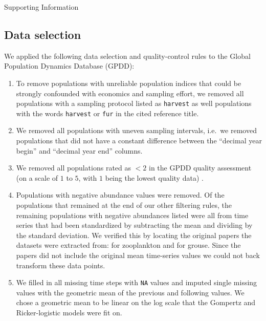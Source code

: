 
\begin{centering}
\LARGE
Supporting Information\\[1.0em]
\end{centering}

\subsection{Data selection}

We applied the following data selection and quality-control rules to the
Global Population Dynamics Database (GPDD):

\begin{enumerate}

\item To remove populations with unreliable population indices that could be
  strongly confounded with economics and sampling effort, we removed all
  populations with a sampling protocol listed as \texttt{harvest} as well
  populations with the words \texttt{harvest} or \texttt{fur} in the cited
  reference title.

\item We removed all populations with uneven sampling intervals, i.e.\ we
  removed populations that did not have a constant difference between the
  ``decimal year begin'' and ``decimal year end'' columns.

\item We removed all populations rated as $< 2$ in the GPDD quality assessment
  (on a scale of $1$ to $5$, with $1$ being the lowest quality data)
  \citep[following][]{sibly2005, ziebarth2010}.

\item Populations with negative abundance values were removed. Of the
  populations that remained at the end of our other filtering rules, the
  remaining populations with negative abundances listed were all from time
  series that had been standardized by subtracting the mean and dividing by the
  standard deviation. We verified this by locating the original papers the
  datasets were extracted from: \citet{colebrook1978} for zooplankton and
  \citet{lindstrom1995} for grouse. Since the papers did not include the
  original mean time-series values we could not back transform these data
  points.

\item We filled in all missing time steps with \texttt{NA} values and imputed
  single missing values with the geometric mean of the previous and following
  values. We chose a geometric mean to be linear on the log scale that the
  Gompertz and Ricker-logistic models were fit on.


\end{enumerate}
